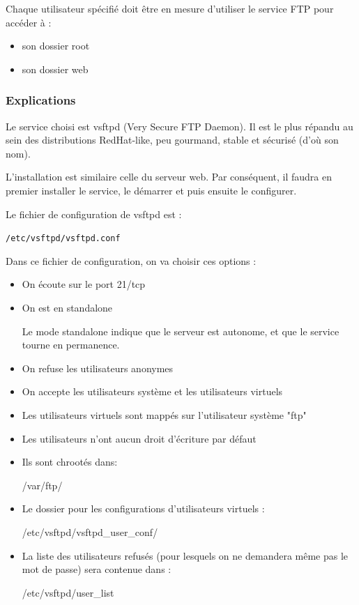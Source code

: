 \documentclass{article}
\begin{document}
	Chaque utilisateur spécifié doit être en mesure d'utiliser le service FTP pour accéder à :
	\begin{itemize}
		\item son dossier root
		\item son dossier web
	\end{itemize}

	\subsubsection{Explications}
	
	Le service choisi est vsftpd (Very Secure FTP Daemon). Il est le plus répandu au sein des distributions RedHat-like, peu gourmand, stable et sécurisé (d'où son nom).
	
	L'installation est similaire  celle du serveur web. Par conséquent, il faudra en premier installer le service, le démarrer et puis ensuite le configurer.
	
	Le fichier de configuration de vsftpd est : 
	\begin{center}
			\texttt{/etc/vsftpd/vsftpd.conf}
	\end{center}

	Dans ce fichier de configuration, on va choisir ces options :
	\begin{itemize}
	\item On écoute sur le port 21/tcp 
    \item On est en standalone 
    
Le mode standalone indique que le serveur est autonome, et que le service tourne en permanence. 
    \item On refuse les utilisateurs anonymes 
    \item On accepte les utilisateurs système et les utilisateurs virtuels 
    \item Les utilisateurs virtuels sont mappés sur l'utilisateur système "ftp" 
    \item Les utilisateurs n'ont aucun droit d'écriture par défaut 
    \item Ils sont chrootés dans:
    \begin{center}
		/var/ftp/
	\end{center}
    \item Le dossier pour les configurations d'utilisateurs virtuels :
    \begin{center}
 		/etc/vsftpd/vsftpd\_user\_conf/
	\end{center}
    \item La liste des utilisateurs refusés (pour lesquels on ne demandera même pas le mot de passe) sera contenue dans :
	\begin{center}
		/etc/vsftpd/user\_list
	\end{center}		
	\end{itemize}
	
\end{document}
